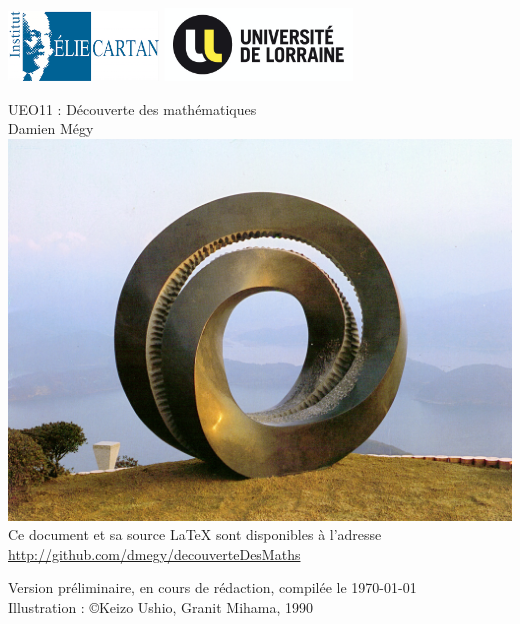\documentclass[11pt,a4paper]{book}
\theoremstyle{definition}
\theoremstyle{plain}
\begin{document}
\begin{titlepage}



\includegraphics[width=4cm]{img/logo-IECL}
\hfill
\includegraphics[width=5cm]{img/logo-UL}\\
\vspace{3em}
\begin{center}
{\Huge UEO11 : Découverte des mathématiques}\\
\vspace{3em}
{Damien Mégy\\
\vspace{3em}
\includegraphics[width=15cm]{img/Keizo_Ushio_Granit_Mihama_1990}
{\small \faGithub{}  Ce document et sa source \LaTeX{} sont disponibles à l'adresse\\
\url{http://github.com/dmegy/decouverteDesMaths}\\}
}

\vspace{3em}
Version préliminaire, en cours de rédaction, compilée le \today{}\\%
\vspace{3em}
\small{Illustration : \copyright Keizo Ushio, Granit Mihama, 1990\\}

\end{center}
\end{titlepage}
\end{document}
